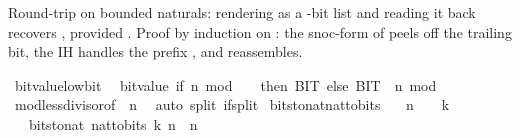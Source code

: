 \begin{isabellebody}
%
\isadelimproof
%
\endisadelimproof
%
\begin{isamarkuptext}%
Round-trip on bounded naturals: rendering  as
  a -bit list and reading it back recovers ,
  provided .  Proof by induction on :
  the snoc-form of  peels off the
  trailing bit, the IH handles the prefix , and
   reassembles.%
\end{isamarkuptext}\isamarkuptrue%
\isamarkupfalse%
\ bit{\isacharunderscore}{\kern0pt}value{\isacharunderscore}{\kern0pt}low{\isacharunderscore}{\kern0pt}bit{\isacharcolon}{\kern0pt}\isanewline
\ \ {\isachardoublequoteopen}bit{\isacharunderscore}{\kern0pt}value\ {\isacharparenleft}{\kern0pt}if\ n\ mod\ {}\ {\isacharequal}{\kern0pt}\ {}\ then\ BIT{}\ else\ BIT{}{\isacharparenright}{\kern0pt}\ {\isacharequal}{\kern0pt}\ n\ mod\ {}{\isachardoublequoteclose}\isanewline
%
\isadelimproof
\ \ %
\endisadelimproof
%
\isatagproof
{}\isamarkupfalse%
\ mod{\isacharunderscore}{\kern0pt}less{\isacharunderscore}{\kern0pt}divisor{\isacharbrackleft}{\kern0pt}of\ {}\ n{\isacharbrackright}{\kern0pt}\ \isamarkupfalse%
\ {\isacharparenleft}{\kern0pt}auto\ split{\isacharcolon}{\kern0pt}\ if{\isacharunderscore}{\kern0pt}split{\isacharparenright}{\kern0pt}%
\endisatagproof
{\isafoldproof}%
%
\isadelimproof
\isanewline
%
\endisadelimproof
\isanewline
{}\isamarkupfalse%
\ bits{\isacharunderscore}{\kern0pt}to{\isacharunderscore}{\kern0pt}nat{\isacharunderscore}{\kern0pt}nat{\isacharunderscore}{\kern0pt}to{\isacharunderscore}{\kern0pt}bits{\isacharcolon}{\kern0pt}\isanewline
\ \ \ {\isachardoublequoteopen}n\ {\isacharless}{\kern0pt}\ {}\ {\isacharcircum}{\kern0pt}\ k{\isachardoublequoteclose}\isanewline
\ \ \ {\isachardoublequoteopen}bits{\isacharunderscore}{\kern0pt}to{\isacharunderscore}{\kern0pt}nat\ {\isacharparenleft}{\kern0pt}nat{\isacharunderscore}{\kern0pt}to{\isacharunderscore}{\kern0pt}bits\ k\ n{\isacharparenright}{\kern0pt}\ {\isacharequal}{\kern0pt}\ n{\isachardoublequoteclose}\isanewline
%
\isadelimproof

\end{isabellebody}
